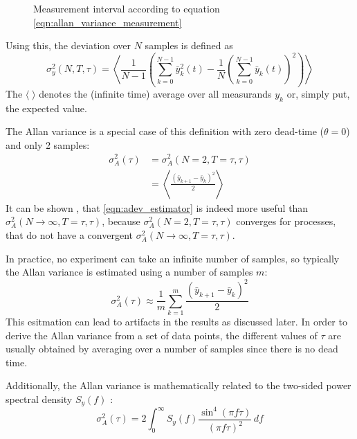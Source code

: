 \begin{figure}[hb]
    \centering
    \caption{Measurement interval according to equation \ref{eqn:allan_variance_measurement}}
    \label{fig:allan_variance_definitions}
\end{figure}

Using this, the deviation over $N$ samples is defined as \cite{adev,psd_to_adev}
\begin{equation}
    \sigma_y^2(N,T,\tau) = \left\langle \frac{1}{N-1} \left(\sum _{k=0}^{N-1}\bar y_k^2(t)-\frac{1}{N}\left(\sum _{k=0}^{N-1} \bar y_k(t)\right)^2\right)\right\rangle
\end{equation}
The $\langle \; \rangle$ denotes the (infinite time) average over all measurands $y_k$ or, simply put, the expected value.

The Allan variance is a special case of this definition with zero dead-time ($\theta=0$) and only 2 samples:
\begin{align}
    \sigma_A^2(\tau) &= \sigma_A^2(N=2,T=\tau,\tau) \label{eqn:allan_coefficients}\\
    &= \left\langle \frac{\left(\bar y_{k+1} - \bar y_k \right)^2}{2} \right\rangle
\end{align}
It can be shown \cite{psd_to_adev}, that \ref{eqn:adev_estimator} is indeed more useful than $\sigma_A^2(N\to\infty,T=\tau,\tau)$, because $\sigma_A^2(N=2,T=\tau,\tau)$ converges for processes, that do not have a convergent $\sigma_A^2(N\to\infty,T=\tau,\tau)$.

In practice, no experiment can take an infinite number of samples, so typically the Allan variance is estimated using a number of samples $m$:
\begin{equation}
    \sigma_A^2(\tau) \approx \frac1 m \sum_{k=1}^m \frac{\left(\bar y_{k+1} - \bar y_{k} \right)^2}{2} \label{eqn:adev_estimator}
\end{equation}
This esitmation can lead to artifacts in the results as discussed later. In order to derive the Allan variance from a set of data points, the different values of $\tau$ are usually obtained by averaging over a number of samples since there is no dead time.

Additionally, the Allan variance is mathematically related to the two-sided power spectral density $S_y(f)$ \cite{psd_to_adev}:
\begin{equation}
    \sigma_A^2(\tau) = 2 \int_0^\infty S_y(f) \frac{\sin^4\left( \pi f \tau \right)}{(\pi f \tau)^2}\,df \label{eqn:psd_to_adev}
\end{equation}

